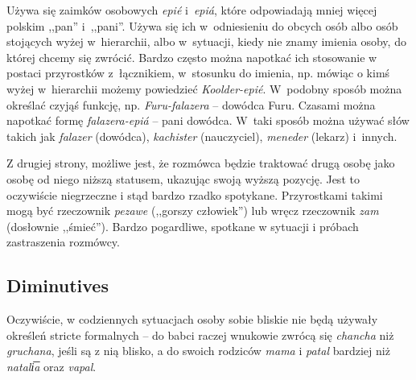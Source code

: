 \skipline

Używa się zaimków osobowych \emph{epié} i~\emph{epiá}, które odpowiadają mniej
więcej polskim ,,pan'' i~,,pani''. Używa się ich w~odniesieniu do obcych osób
albo osób stojących wyżej w~hierarchii, albo w~sytuacji, kiedy nie znamy imienia
osoby, do której chcemy się zwrócić. Bardzo często można napotkać ich stosowanie
w postaci przyrostków z~łącznikiem, w~stosunku do imienia, np. mówiąc o kimś
wyżej w~hierarchii możemy powiedzieć \emph{Koolder-epié}. W~podobny sposób
można określać czyjąś funkcję, np. \emph{Furu-falazera} -- dowódca Furu. Czasami
można napotkać formę \emph{falazera-epiá} -- pani dowódca. W~taki sposób można
używać słów takich jak \emph{falazer} (dowódca), \emph{kachister} (nauczyciel),
\emph{meneder} (lekarz) i~innych.


\skipline

Z drugiej strony, możliwe jest, że rozmówca będzie traktować drugą osobę jako
osobę od niego niższą statusem, ukazując swoją wyższą pozycję. Jest to
oczywiście niegrzeczne i stąd bardzo rzadko spotykane. Przyrostkami takimi mogą
być rzeczownik \emph{pezawe} (,,gorszy człowiek'') lub wręcz rzeczownik
\emph{zam} (dosłownie ,,śmieć''). Bardzo pogardliwe, spotkane w sytuacji i
próbach zastraszenia rozmówcy.

\subsection{Diminutives}

Oczywiście, w codziennych sytuacjach osoby sobie bliskie nie będą używały
określeń stricte formalnych -- do babci raczej wnukowie zwrócą się
\emph{chancha} niż \emph{gruchana}, jeśli są z nią blisko, a do swoich rodziców
\emph{mama} i \emph{patal} bardziej niż \emph{natali͞a} oraz \emph{vapal}.


